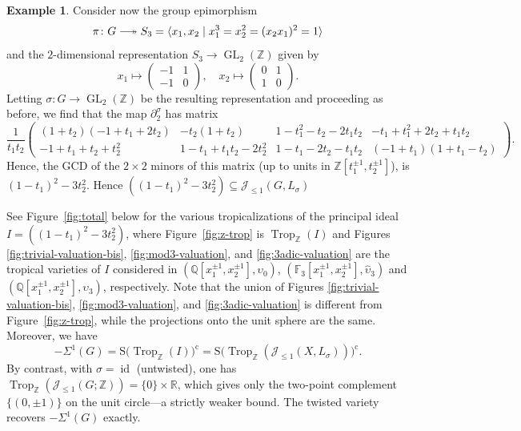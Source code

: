 \documentclass[11pt]{amsart}
\theoremstyle{definition}
\newtheorem{example}[theorem]{Example}
\newcommand{\Z}{\mathbb{Z}}
\newcommand{\Q}{\mathbb{Q}}
\newcommand{\R}{\mathbb{R}}
\newcommand{\cJ}{\mathcal{J}}
\newcommand{\rS}{\mathrm{S}}
\DeclareMathOperator{\id}{id}
\DeclareMathOperator{\GL}{GL}
\DeclareMathOperator{\Trop}{Trop}
\newcommand{\longsurj}{\relbar\joinrel\twoheadrightarrow}
\newcommand{\compl}{\mathrm{c}}
\begin{document}
\begin{example}
Consider now the group epimorphism 
\[
\pi\colon G\longsurj S_3=\langle x_1,x_2\mid 
x_1^3=x_2^2=(x_2x_1)^2=1\rangle
\]
and the $2$-dimensional representation $S_3\to \GL_2(\Z)$ given by 
\begin{equation*}
 x_1 \mapsto  \begin{pmatrix}
      -1 & 1 \\
     -1 & 0
 \end{pmatrix} , \quad 
 x_2\mapsto \begin{pmatrix}
     0 & 1 \\
     1 & 0
 \end{pmatrix}.
\end{equation*}
Letting $\sigma\colon G\to \GL_2(\Z)$ be the resulting representation and 
proceeding as before, we find that the map $\partial_2^{\sigma}$ has matrix  
\begin{equation*}
\frac{1}{t_1t_2}
\begin{pmatrix}
(1 + t_2) (-1 + t_1 + 2 t_2)& -t_2 (1 + t_2)& 
1 - t_1^2 - t_2 - 2 t_1 t_2& -t_1 + t_1^2 + 2 t_2 + t_1 t_2
\\
-1 + t_1 + t_2 + t_2^2& 1 - t_1 + t_1 t_2 - 2 t_2^2&
  1 - t_1 - 2 t_2 - t_1 t_2 & (-1 + t_1) (1 + t_1 - t_2)
\end{pmatrix}.
\end{equation*}
Hence, the GCD of the $2\times 2$ minors of this matrix (up to units 
in $\Z[t_1^{\pm 1}, t_2^{\pm 1}]$), is  $ (1 - t_1)^2 - 3 t_2^2$. Hence 
$((1 - t_1)^2 - 3 t_2^2)\subseteq \cJ_{\leq 1}(G,L_\sigma) $

See Figure~\ref{fig:total} below for the various tropicalizations of the principal ideal
$I=((1 - t_1)^2 - 3 t_2^2)$, where Figure~\ref{fig:z-trop} is 
$\Trop_\Z(I)$ and  Figures \ref{fig:trivial-valuation-bis}, 
\ref{fig:mod3-valuation}, and \ref{fig:3adic-valuation} 
are the tropical varieties of $I$ 
considered in $ (\Q[x_1^{\pm 1},x_2^{\pm 1}],\upsilon_0)$, 
$(\mathbb{F}_3[x_1^{\pm 1},x_2^{\pm 1}],\hat{\upsilon}_3)$ and 
$(\Q[x_1^{\pm 1},x_2^{\pm 1}], \upsilon_3)$, respectively. Note that the union of 
Figures \ref{fig:trivial-valuation-bis}, \ref{fig:mod3-valuation}, and 
\ref{fig:3adic-valuation} is different from Figure~\ref{fig:z-trop}, 
while the projections onto the unit sphere are the same. Moreover, we have 
\[
-\Sigma^1(G)=\rS\big(\!\Trop_\Z( I)\big)^{\compl}=
\rS\big(\!\Trop_\Z( \cJ_{\le 1}(X,L_\sigma))\big)^{\compl}.
\]
By contrast, with $\sigma = \id$ (untwisted), one has 
$\Trop_\Z(\cJ_{\le 1}(G;\Z)) = \{0\}\times \R$, 
which gives only the two-point complement $\{(0,\pm 1)\}$ 
on the unit circle---a strictly weaker bound. The twisted variety recovers 
$-\Sigma^1(G)$ exactly.
\end{example}
\end{document}
